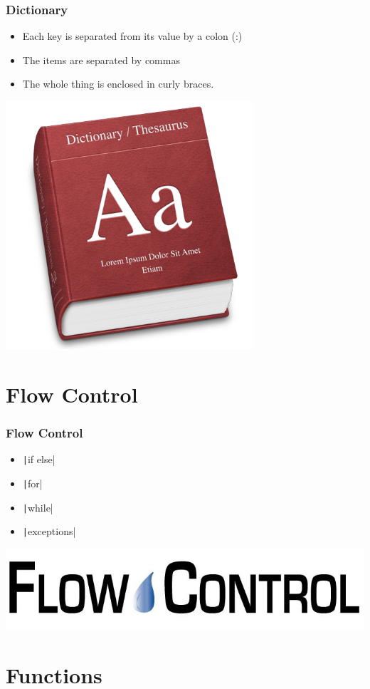 \documentclass{../py-lecture}
\begin{document}
\begin{frame}
	\frametitle{Dictionary}
  \begin{itemize}
    \item Each key is separated from its value by a colon (:)
    \item The items are separated by commas
    \item The whole thing is enclosed in curly braces.
  \end{itemize}
	\centering\includegraphics[width=.4\textwidth]{img/dictionary.jpg}
\end{frame}

\section{Flow Control}

\begin{frame}
	\frametitle{Flow Control}
  \begin{itemize}
    \item \texttt|if else|
    \item \texttt|for|
    \item \texttt|while|
    \item \texttt|exceptions|
  \end{itemize}
	\centering\includegraphics[width=.4\textwidth]{img/flow-control.jpg}
\end{frame}

\section{Functions}
\end{document}
